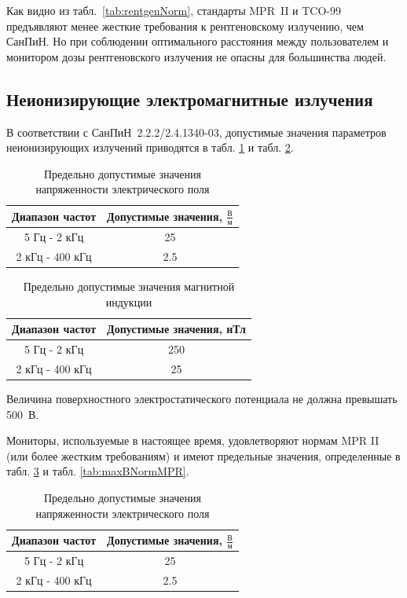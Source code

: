 Как видно из табл.~\ref{tab:rentgenNorm}, стандарты MPR~II и TCO-99 предъявляют менее жесткие требования к рентгеновскому излучению, чем СанПиН. Но при соблюдении оптимального расстояния между пользователем и монитором дозы рентгеновского излучения не опасны для большинства людей.

\subsection{Неионизирующие электромагнитные излучения}
В соответствии с СанПиН~2.2.2/2.4.1340-03, допустимые значения параметров неионизирующих излучений приводятся в табл. \ref{tab:maxENormSanPiN} и табл. \ref{tab:maxBNormSanPiN}.

\begin{table}[ht]
  \center
  \caption{Предельно допустимые значения напряженности электрического поля}
  \begin{tabular}{|c|c|}
  \hline
  Диапазон частот & Допустимые значения, $\frac{\text{В}}{\text{м}}$ \\
  \hline
  5 Гц - 2 кГц & 25 \\
  \hline
  2 кГц - 400 кГц & 2.5 \\
  \hline
  \end{tabular}
  \label{tab:maxENormSanPiN}
\end{table}

\begin{table}[ht]
  \center
  \caption{Предельно допустимые значения магнитной индукции}
  \begin{tabular}{|c|c|}
  \hline
  Диапазон частот & Допустимые значения, нТл \\
  \hline
  5 Гц - 2 кГц & 250 \\
  \hline
  2 кГц - 400 кГц & 25 \\
  \hline
  \end{tabular}
  \label{tab:maxBNormSanPiN}
\end{table}

Величина поверхностного электростатического потенциала не должна превышать 500~В. 

Мониторы, используемые в настоящее время, удовлетворяют нормам MPR II (или более жестким требованиям) и имеют предельные значения, определенные в табл. \ref{tab:maxENormMPR} и табл. \ref{tab:maxBNormMPR}.

\begin{table}[ht]
  \center
  \caption{Предельно допустимые значения напряженности электрического поля}
  \begin{tabular}{|c|c|}
  \hline
  Диапазон частот & Допустимые значения, $\frac{\text{В}}{\text{м}}$ \\
  \hline
  5 Гц - 2 кГц & 25 \\
  \hline
  2 кГц - 400 кГц & 2.5 \\
  \hline
  \end{tabular}
  \label{tab:maxENormMPR}
\end{table}

